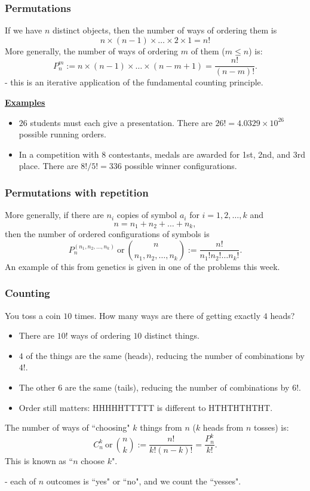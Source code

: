 \documentclass[t,8pt]{beamer}
\begin{document}
\begin{frame}
	\frametitle{Permutations}
	If we have $n$ distinct objects, then the number of ways of ordering them is
	$$n\times (n-1)\times\dots\times 2\times 1=n!$$
	More generally, the number of ways of ordering $m$ of them ($m\leq n$) is:
	$$P_n^m:=n\times (n-1)\times\dots\times (n-m+1)=\frac{n!}{(n-m)!}.$$
	{\small\color{NavyBlue} - this is an iterative application of the fundamental counting principle.} \par
	{\bf\underline{Examples}}
	\begin{itemize}
		\item $26$ students must each give a presentation.  
		There are $26!=4.0329\times 10^{26}$ possible running orders.
		\item In a competition with $8$ contestants, medals are awarded for 1st, 2nd, and 3rd place.  
		There are $8!/5!=336$ possible winner configurations.
	\end{itemize}
\end{frame}

\begin{frame}
	\frametitle{Permutations with repetition}
	More generally, if there are $n_i$ copies of symbol $a_i$ for $i=1,2,\dots,k$ and
	$$n=n_1+n_2+\dots+n_k,$$
	then the number of ordered configurations of symbols is
	$$
	P_n^{(n_1,n_2,\dots,n_k)}
	\ \text{or}\ 
	{n\choose {n_1,n_2,\dots,n_k}}
	:=\frac{n!}{n_1!n_2!\dots n_k!}.
	$$
	An example of this from genetics is given in one of the problems this week.
\end{frame}

\begin{frame}
	\frametitle{Counting}
	You toss a coin $10$ times. How many ways are there of getting exactly $4$ heads?
	\begin{itemize}
		\item There are $10!$ ways of ordering $10$ distinct things.
		\item $4$ of the things are the same (heads), reducing the number of combinations by $4!$.
		\item The other $6$ are the same (tails), reducing the number of combinations by $6!$.
		\item Order still matters: HHHHHTTTTT is different to HTHTHTHTHT.
	\end{itemize}
	The number of ways of ``choosing" $k$ things from $n$ ($k$ heads from $n$ tosses) is:
	$$C_n^k\ \text{or}\ {n\choose k}:=\frac{n!}{k!(n-k)!}=\frac{P_n^k}{k!}.$$
	This is known as ``$n$ choose $k$". \par
	{\small\color{NavyBlue} - each of $n$ outcomes is ``yes" or ``no", and we count the ``yesses".}
\end{frame}
\end{document}
